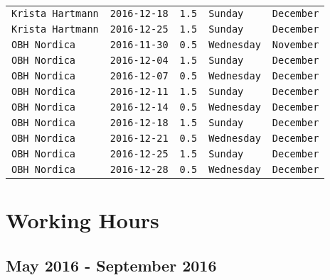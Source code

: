 \documentclass[11pt,A4paper,]{article}
\begin{document}
\begin{longtable}[]{@{}lrrll@{}}
\texttt{Krista\ Hartmann} & \texttt{2016-12-18} & \texttt{1.5} &
\texttt{Sunday} & \texttt{December}\tabularnewline
\texttt{Krista\ Hartmann} & \texttt{2016-12-25} & \texttt{1.5} &
\texttt{Sunday} & \texttt{December}\tabularnewline
\texttt{OBH\ Nordica} & \texttt{2016-11-30} & \texttt{0.5} &
\texttt{Wednesday} & \texttt{November}\tabularnewline
\texttt{OBH\ Nordica} & \texttt{2016-12-04} & \texttt{1.5} &
\texttt{Sunday} & \texttt{December}\tabularnewline
\texttt{OBH\ Nordica} & \texttt{2016-12-07} & \texttt{0.5} &
\texttt{Wednesday} & \texttt{December}\tabularnewline
\texttt{OBH\ Nordica} & \texttt{2016-12-11} & \texttt{1.5} &
\texttt{Sunday} & \texttt{December}\tabularnewline
\texttt{OBH\ Nordica} & \texttt{2016-12-14} & \texttt{0.5} &
\texttt{Wednesday} & \texttt{December}\tabularnewline
\texttt{OBH\ Nordica} & \texttt{2016-12-18} & \texttt{1.5} &
\texttt{Sunday} & \texttt{December}\tabularnewline
\texttt{OBH\ Nordica} & \texttt{2016-12-21} & \texttt{0.5} &
\texttt{Wednesday} & \texttt{December}\tabularnewline
\texttt{OBH\ Nordica} & \texttt{2016-12-25} & \texttt{1.5} &
\texttt{Sunday} & \texttt{December}\tabularnewline
\texttt{OBH\ Nordica} & \texttt{2016-12-28} & \texttt{0.5} &
\texttt{Wednesday} & \texttt{December}\tabularnewline
\bottomrule
\end{longtable}

\section{Working Hours}\label{working-hours}

\subsection{May 2016 - September 2016}\label{may-2016---september-2016}
\end{document}
